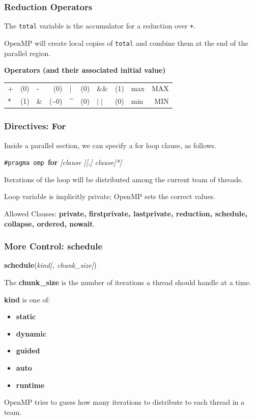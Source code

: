 \begin{frame}
\frametitle{Reduction Operators}

The {\tt total} variable is the accumulator for a
reduction over {\tt +}. 

OpenMP will create local copies of {\tt total} and 
combine them at the end of the parallel region.

{\bf Operators (and their associated initial value)}
  \begin{center}
    \begin{tabular}{l r | l r | l r | l r | l r}
      + & (0) & -  &  (0) &    $\mid$ & (0) & \&\& & (1) & max & MAX\\
      * & (1) & \& & (\~{}0) & \^{} & (0) &   $\mid\mid$ & (0) & min & MIN\\ 
    \end{tabular}
  \end{center}
\end{frame}


\begin{frame}
\frametitle{Directives: For}

Inside a parallel section, we can
specify a for loop clause, as follows.

  \begin{center}
    {\tt \#pragma omp }{\bf for} {\it [clause [[,] clause]*]}
  \end{center}

    Iterations of the loop will be distributed among the
      current team of threads.
      
    Loop variable is implicitly private; OpenMP sets the
      correct values.

  Allowed Clauses: {\bf private, firstprivate, lastprivate, reduction, schedule,
    collapse, ordered, nowait}.

\end{frame}


\begin{frame}
\frametitle{More Control: schedule}

  \begin{center}
    {\bf schedule}({\it kind[, chunk\_size]})
  \end{center}

    The {\bf chunk\_size} is the number of iterations a thread
      should handle at a time. 
      
{\bf kind} is one of:
      \begin{itemize}
        \item {\bf static}
		\item {\bf dynamic}
        \item {\bf guided}
        \item {\bf auto}
        \item {\bf runtime}
      \end{itemize}

OpenMP tries to guess how many iterations to distribute to each thread
in a team.

\end{frame}


